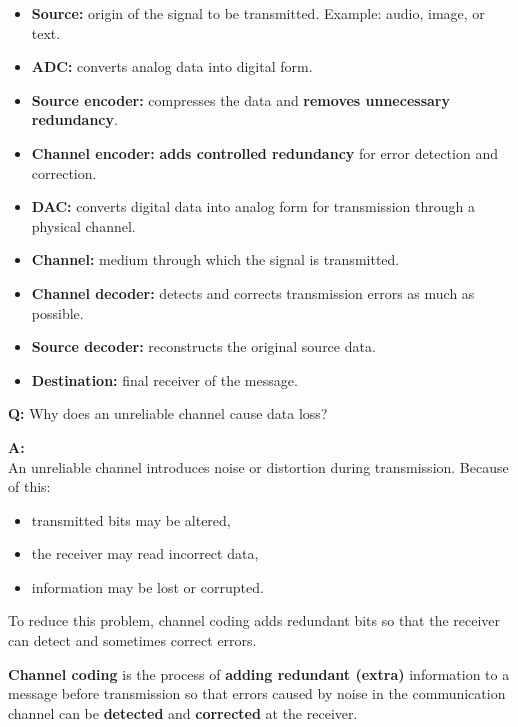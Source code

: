 \documentclass[11pt,a4paper]{book}
\newenvironment{definitionbox}[1][Definition]{%
    \begin{tcolorbox}[
        enhanced,
        breakable,
        colback=primaryblue!10,
        colframe=primaryblue!150,
        title=#1,
        fonttitle=\bfseries,
        sharp corners,
        boxrule=0.8pt,
        left=8pt,
        right=8pt,
        top=6pt,
        bottom=6pt
    ]
}{\end{tcolorbox}}
\newcounter{qna}[chapter]
\renewcommand{\theqna}{\thechapter.\arabic{qna}}
\newenvironment{questionanswerbox}[1][Example]{%
    \refstepcounter{qna}
    \begin{tcolorbox}[
        enhanced,
        breakable,
        colback=softlavender!10,
        colframe=softlavender!200,
        title={#1~\theqna},
        fonttitle=\bfseries,
        coltitle=white,
        colbacktitle=softlavender!200,
        sharp corners,
        boxrule=1pt,
        left=8pt,
        right=8pt,
        top=6pt,
        bottom=6pt
    ]
}{\end{tcolorbox}}
\begin{document}
\begin{itemize}
    \item \textbf{Source:} origin of the signal to be transmitted. Example: audio, image, or text.
    \item \textbf{ADC:} converts analog data into digital form.
    \item \textbf{Source encoder:} compresses the data and \textbf{removes unnecessary redundancy}.
    \item \textbf{Channel encoder:} \textbf{adds controlled redundancy} for error detection and correction.
    \item \textbf{DAC:} converts digital data into analog form for transmission through a physical channel.
    \item \textbf{Channel:} medium through which the signal is transmitted.
    \item \textbf{Channel decoder:} detects and corrects transmission errors as much as possible.
    \item \textbf{Source decoder:} reconstructs the original source data.
    \item \textbf{Destination:} final receiver of the message.
\end{itemize}

\begin{questionanswerbox}[Unreliable Channel Causes Data Loss Example]
\textbf{Q:} Why does an unreliable channel cause data loss?

\textbf{A:}\\
An unreliable channel introduces noise or distortion during transmission. Because of this:
\begin{itemize}
    \item transmitted bits may be altered,
    \item the receiver may read incorrect data,
    \item information may be lost or corrupted.
\end{itemize}
\par\vspace{\baselineskip}
To reduce this problem, channel coding adds redundant bits so that the receiver can detect and sometimes correct errors.
\end{questionanswerbox}

\begin{definitionbox}[Channel Coding]
    \textbf{Channel coding} is the process of \textbf{adding redundant (extra)} information to a message before transmission so that errors caused by noise in the communication channel can be \textbf{detected} and \textbf{corrected} at the receiver.
\end{definitionbox}
\end{document}

